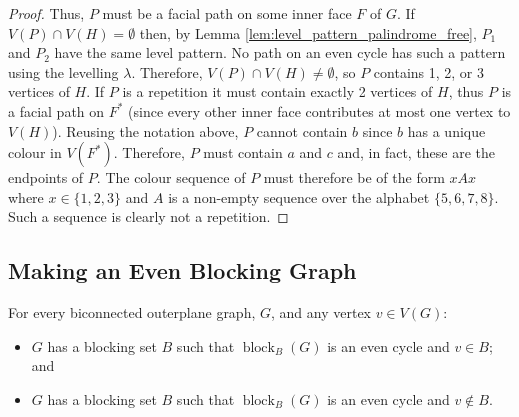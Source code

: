 \documentclass{patmorin}
\DeclareMathOperator{\block}{block}
\begin{document}
\begin{proof}
Thus, $P$ must be a facial path on some inner face $F$ of $G$.  If $V(P) \cap V(H) =
\emptyset$ then, by Lemma \ref{lem:level_pattern_palindrome_free},
$P_1$ and $P_2$ have the same level pattern.  No path on an even cycle
has such a pattern using the levelling $\lambda$.
Therefore, $V(P)\cap V(H)\neq\emptyset$, so $P$ contains 1, 2, or
3 vertices of $H$.  If $P$ is a repetition it must contain exactly
2 vertices of $H$, thus $P$ is a facial path on $F^*$ (since every
other inner face contributes at most one vertex to $V(H)$).  Reusing the
notation above, $P$ cannot contain $b$ since $b$ has a unique colour in
$V(F^*)$. Therefore, $P$ must contain $a$ and $c$ and, in fact, these are
the endpoints of $P$.  The colour sequence of $P$ must therefore be of
the form $xAx$ where $x\in\{1,2,3\}$ and $A$ is a non-empty sequence over
the alphabet $\{5,6,7,8\}$.  Such a sequence is clearly not a repetition.
\end{proof}


\subsection{Making an Even Blocking Graph}

\begin{lem}
  For every biconnected outerplane graph, $G$, and any vertex $v\in V(G)$:
  \begin{itemize}
    \item $G$ has a blocking set $B$ such that $\block_B(G)$ is an even cycle 
       and $v\in B$; and
    \item $G$ has a blocking set $B$ such that $\block_B(G)$ is an even cycle 
       and $v\not\in B$.
  \end{itemize}
\end{lem}
\end{document}
